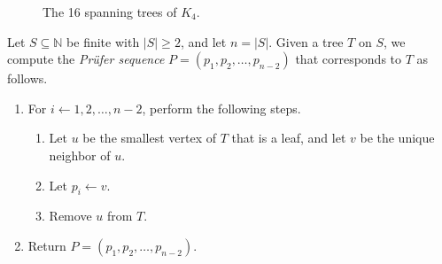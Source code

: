 \documentclass[11pt]{article}
\newcommand{\NN}{\mathbb{N}}
\begin{document}
\begin{example}
\begin{figure}[hbt!]
\begin{minipage}{0.17\textwidth}
    \end{minipage}
    \begin{minipage}{0.17\textwidth}
    \end{minipage}
    \caption{The 16 spanning trees of $K_4$.}
  \end{figure}
\end{example}

\begin{algorithm}[Encoding]
  Let $S \subseteq \NN$ be finite with $|S| \geq 2$, and let $n = |S|$.
  Given a tree $T$ on $S$, we compute the \emph{Pr\"ufer sequence} $P = (p_1, p_2, \dots, p_{n-2})$ that corresponds to $T$ as follows.
  \begin{enumerate}[label=\arabic*.]
    \item For $i \gets 1, 2, \dots, n-2$, perform the following steps.
    \begin{enumerate}[label*=\arabic*.]
      \item Let $u$ be the smallest vertex of $T$ that is a leaf, and let $v$ be the unique neighbor of $u$.
      \item Let $p_i \gets v$.
      \item Remove $u$ from $T$.
    \end{enumerate}
    \item Return $P = (p_1, p_2, \dots, p_{n-2})$.
  \end{enumerate}
\end{algorithm}
\end{document}
